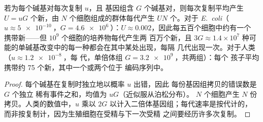 \begin{theorem}[每个基因组与每个种群的突变数]\label{thm:b2:genome-diversification:rate}
若为每个碱基对每次复制 $u$，且
基因组含 $G$ 个碱基对，则每次复制平均产生
$U = uG$ 个新，由 $N$ 个细胞组成的群体每代产生 $UN$
个。对于 \emph{E.~coli}（$u \approx \qty{5e-10}{}$，$G =
\qty{4.6e6}{}$）：$U \approx 0.002$，因此每五百个细胞中约有一个
携带新——但 $10^{9}$ 个细胞的培养物每代产生两
百万个新，且 $3G \approx 1.4\times
10^{7}$ 种可能的单碱基改变中的每一种都会在其中某处出现，每隔
几代出现一次。对于人类（$u \approx \qty{1.2e-8}{}$，每
代，单倍体组 $G = \qty{3.2e9}{}$，共两组）：每个
孩子平均携带约 \num{75} 个新，其中一个或两个位于
编码序列中。
\end{theorem}
\begin{proof}
每个碱基在复制时独立地以概率 $u$ 出错，因此
每份基因组拷贝的错误数是 $G$ 个独立
稀有事件之和，均值为 $uG$（近似服从泊松分布）。
$N$ 个细胞产生 $N$ 份拷贝。人类的数值中，$u$ 乘以 $2G$
以计入二倍体基因组；每代速率是按代计的，
而非按复制计，因为生殖细胞在受精与下一次受精
之间要经历许多次复制。
\end{proof}

